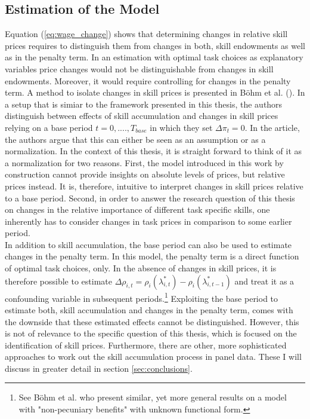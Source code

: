 \documentclass[../main.tex]{subfiles}
\begin{document}
\subsection{Estimation of the Model} \label{sec:model_estimation}
Equation (\ref{eq:wage_change}) shows that determining changes in relative skill prices requires to distinguish them from changes in both, skill endowments as well as in the penalty term. In an estimation with optimal task choices as explanatory variables price changes would not be distinguishable from changes in skill endowments. Moreover, it would require controlling for changes in the penalty term. A method to isolate changes in skill prices is presented in Böhm et al. (\citeyear{bohm2019occupation}). In a setup that is simiar to the framework presented in this thesis, the authors distinguish between effects of skill accumulation and changes in skill prices relying on a base period $t=0, ...., T_{base}$ in which they set $\Delta \pi_t = 0$. In the article, the authors argue that this can either be seen as an assumption or as a normalization. In the context of this thesis, it is straight forward to think of it as a normalization for two reasons. First, the model introduced in this work by construction cannot provide insights on absolute levels of prices, but relative prices instead. It is, therefore, intuitive to interpret changes in skill prices relative to a base period. Second, in order to answer the research question of this thesis on changes in the relative importance of different task specific skills, one inherently has to consider changes in task prices in comparison to some earlier period.
\\
In addition to skill accumulation, the base period can also be used to estimate changes in the penalty term. In this model, the penalty term is a direct function of optimal task choices, only. In the absence of changes in skill prices, it is therefore possible to estimate $\Delta \rho_{i,t} = \rho_i(\lambda_{i,t}^*) - \rho_i(\lambda_{i,t-1}^*)$ and treat it as a confounding variable in subsequent periods.\footnote{See Böhm et al. \citeyear{bohm2019occupation} who present similar, yet more general results on a model with "non-pecuniary benefits" with unknown functional form.} Exploiting the base period to estimate both, skill accumulation and changes in the penalty term, comes with the downside that these estimated effects cannot be distinguished. However, this is not of relevance to the specific question of this thesis, which is focused on the identification of skill prices. Furthermore, there are other, more sophisticated approaches to work out the skill accumulation process in panel data. These I will discuss in greater detail in section \ref{sec:conclusions}.
\end{document}
